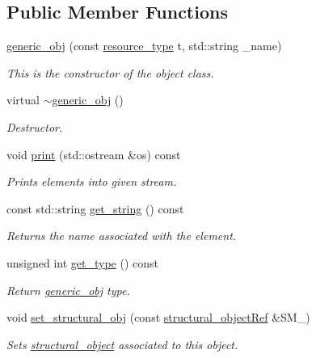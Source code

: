 \subsection*{Public Member Functions}
\begin{DoxyCompactItemize}
\item 
\hyperlink{classgeneric__obj_acc59f17b7aa9f956e9fdcf2127502825}{generic\+\_\+obj} (const \hyperlink{classgeneric__obj_a340b4a97256b423ea4a86bfdf201ec65}{resource\+\_\+type} t, std\+::string \+\_\+name)
\begin{DoxyCompactList}\small\item\em This is the constructor of the object class. \end{DoxyCompactList}\item 
virtual \hyperlink{classgeneric__obj_ae3fa9b164093bb07a0438a5980972c13}{$\sim$generic\+\_\+obj} ()
\begin{DoxyCompactList}\small\item\em Destructor. \end{DoxyCompactList}\item 
void \hyperlink{classgeneric__obj_ad1dbe7ec4abc9bf55d093b0468899a9e}{print} (std\+::ostream \&os) const
\begin{DoxyCompactList}\small\item\em Prints elements into given stream. \end{DoxyCompactList}\item 
const std\+::string \hyperlink{classgeneric__obj_a9e77dcf1f30df84e3bbfbfa1e274a649}{get\+\_\+string} () const
\begin{DoxyCompactList}\small\item\em Returns the name associated with the element. \end{DoxyCompactList}\item 
unsigned int \hyperlink{classgeneric__obj_abbd8f729a1c6ab9b2e842f4d75c81422}{get\+\_\+type} () const
\begin{DoxyCompactList}\small\item\em Return \hyperlink{classgeneric__obj}{generic\+\_\+obj} type. \end{DoxyCompactList}\item 
void \hyperlink{classgeneric__obj_a89d8344e47df397e559fb8e13999d6f4}{set\+\_\+structural\+\_\+obj} (const \hyperlink{structural__objects_8hpp_a8ea5f8cc50ab8f4c31e2751074ff60b2}{structural\+\_\+object\+Ref} \&S\+M\+\_\+)
\begin{DoxyCompactList}\small\item\em Sets \hyperlink{classstructural__object}{structural\+\_\+object} associated to this object. \end{DoxyCompactList}\item 

\end{DoxyCompactItemize}
